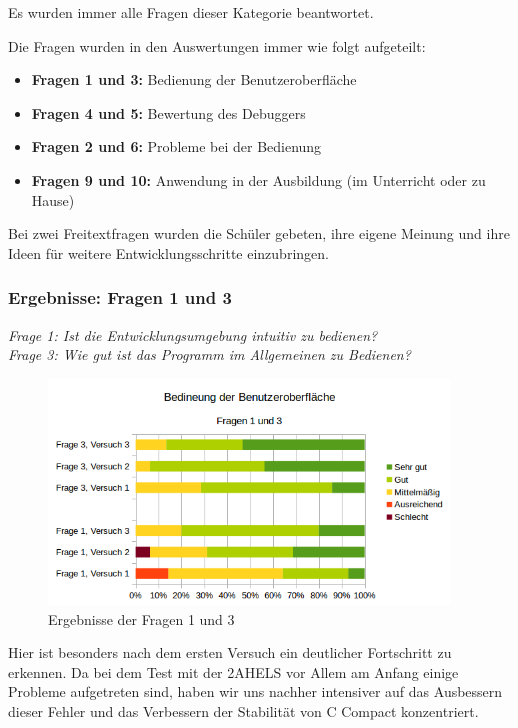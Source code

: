 Es wurden immer alle Fragen dieser Kategorie beantwortet.

Die Fragen wurden in den Auswertungen immer wie folgt aufgeteilt:
\begin{itemize}
\item \textbf{Fragen 1 und 3:} Bedienung der Benutzeroberfläche
\item \textbf{Fragen 4 und 5:} Bewertung des Debuggers
\item \textbf{Fragen 2 und 6:} Probleme bei der Bedienung
\item \textbf{Fragen 9 und 10:} Anwendung in der Ausbildung (im Unterricht oder zu Hause)
\end{itemize}

Bei zwei Freitextfragen wurden die Schüler gebeten, ihre eigene Meinung und ihre Ideen für weitere Entwicklungsschritte einzubringen.

\subsubsection*{Ergebnisse: Fragen 1 und 3}

\emph{Frage 1: Ist die Entwicklungsumgebung intuitiv zu bedienen?\\
Frage 3: Wie gut ist das Programm im Allgemeinen zu Bedienen?}

\begin{figure}[h!]
\centering
\includegraphics[width=0.95\textwidth]{./media/images/gui/trials/gui-f1-3.png}
\caption{Ergebnisse der Fragen 1 und 3}
\end{figure}

Hier ist besonders nach dem ersten Versuch ein deutlicher Fortschritt zu erkennen. Da bei dem Test mit der 2AHELS vor Allem am Anfang einige Probleme aufgetreten sind, haben wir uns nachher intensiver auf das Ausbessern dieser Fehler und das Verbessern der Stabilität von C Compact konzentriert.

